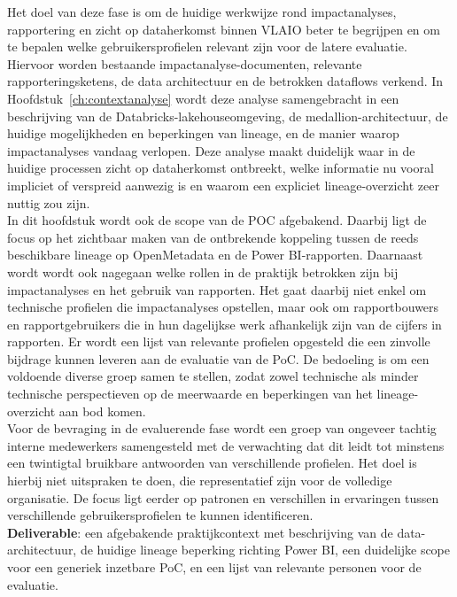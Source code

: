 Het doel van deze fase is om de huidige werkwijze rond impactanalyses, rapportering en zicht op dataherkomst binnen VLAIO beter te begrijpen en om te bepalen welke gebruikersprofielen relevant zijn voor de latere evaluatie. Hiervoor worden bestaande impactanalyse-documenten, relevante rapporteringsketens, de data architectuur en de betrokken dataflows verkend. In Hoofdstuk~\ref{ch:contextanalyse} wordt deze analyse samengebracht in een beschrijving van de Databricks-lakehouseomgeving, de medallion-architectuur, de huidige mogelijkheden en beperkingen van lineage, en de manier waarop impactanalyses vandaag verlopen. Deze analyse maakt duidelijk waar in de huidige processen zicht op dataherkomst ontbreekt, welke informatie nu vooral impliciet of verspreid aanwezig is en waarom een expliciet lineage-overzicht zeer nuttig zou zijn.\\

In dit hoofdstuk wordt ook de scope van de POC afgebakend. Daarbij ligt de focus op het zichtbaar maken van de ontbrekende koppeling tussen de reeds beschikbare lineage op OpenMetadata en de Power BI-rapporten. Daarnaast wordt wordt ook nagegaan welke rollen in de praktijk betrokken zijn bij impactanalyses en het gebruik van rapporten. Het gaat daarbij niet enkel om technische profielen die impactanalyses opstellen, maar ook om rapportbouwers en rapportgebruikers die in hun dagelijkse werk afhankelijk zijn van de cijfers in rapporten. Er wordt een lijst van relevante profielen opgesteld die een zinvolle bijdrage kunnen leveren aan de evaluatie van de PoC. De bedoeling is om een voldoende diverse groep samen te stellen, zodat zowel technische als minder technische perspectieven op de meerwaarde en beperkingen van het lineage-overzicht aan bod komen.\\

Voor de bevraging in de evaluerende fase wordt een groep van ongeveer tachtig interne medewerkers samengesteld met de verwachting dat dit leidt tot minstens een twintigtal bruikbare antwoorden van verschillende profielen. Het doel is hierbij niet uitspraken te doen, die representatief zijn voor de volledige organisatie. De focus ligt eerder op patronen en verschillen in ervaringen tussen verschillende gebruikersprofielen te kunnen identificeren.\\

\textbf{Deliverable}: een afgebakende praktijkcontext met beschrijving van de data-archi\-tec\-tuur, de huidige lineage beperking richting Power BI, een duidelijke scope voor een generiek inzetbare PoC, en een lijst van relevante personen voor de evaluatie.

